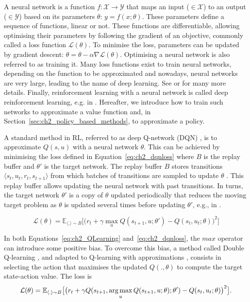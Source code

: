 A neural network is a function $f: \mathcal{X} \rightarrow \mathcal{Y}$ that maps an input ($\in\mathcal{X}$) to an output ($\in\mathcal{Y}$) based on its parameters $\theta$: $y = f(x;\theta)$.
These parameters define a sequence of functions, linear or not.
These functions are differentiable, allowing optimising their parameters by following the gradient of an objective, commonly called a loss function $\mathcal{L}(\theta)$.
To minimise the loss, parameters can be updated by gradient descent: $\theta = \theta - \alpha \nabla \mathcal{L}(\theta)$.
Optimising a neural network is also referred to as training it.
Many loss functions exist to train neural networks, depending on the function to be approximated and nowadays, neural networks are very large, leading to the name of deep learning.
See \citep{zhang2023dive} or \citep{pml1Book} for many more details.
Finally, reinforcement learning with a neural network is called deep reinforcement learning, e.g. in \citep{introDeepRL}.
Hereafter, we introduce how to train such networks to approximate a value function and, in Section~\ref{sec:ch2_policy_based_methods}, to approximate a policy.

A standard method in RL, referred to as deep Q-network (DQN) \citep{Mnih2015}, is to approximate $Q(s, u)$ with a neural network $\theta$.
This can be achieved by minimising the loss defined in Equation~\ref{eq:ch2_dqnloss} where $B$ is the replay buffer and $\theta'$ is the target network.
The replay buffer $B$ stores transitions $\langle s_{t},u_{t},r_{t},s_{t+1}\rangle$ from which batches of transitions are sampled to update $\theta$ \citep{lin1992self}.
This replay buffer allows updating the neural network with past transitions.
In turns, the target network $\theta'$ is a copy of $\theta$ updated periodically that reduces the moving target problem as $\theta$ is updated several times before updating $\theta'$, e.g., in \citep{Mnih2015}.

\begin{equation}
\label{eq:ch2_dqnloss}
    \mathcal{L}(\theta) = \mathbb{E}_{\langle . \rangle\sim B} \big[\big(r_{t} + \gamma \max_u Q(s_{t+1}, u; \theta')- Q(s_{t}, u_{t}; \theta)\big)^{2}\big]
\end{equation}

In both Equations~\ref{eq:ch2_QLearning} and~\ref{eq:ch2_dqnloss}, the $max$ operator can introduce some positive bias. 
To overcome this bias, a method called Double Q-learning \citep{hasselt2010double}, and adapted to Q-learning with approximations \citep{van2016deep}, consists in selecting the action that maximises the updated $Q(., \theta)$ to compute the target state-action value.
The loss is
\begin{equation}
    \label{eq:ch2_doubleQ}
    \mathcal{L}(\theta) = \mathbb{E}_{\langle . \rangle\sim B} \big[\big(r_{t} + \gamma Q(s_{t+1}, \operatorname*{arg\,max}_u Q(s_{t+1}, u;\theta) ; \theta')- Q(s_{t}, u_{t}; \theta)\big)^{2}\big].
\end{equation}

